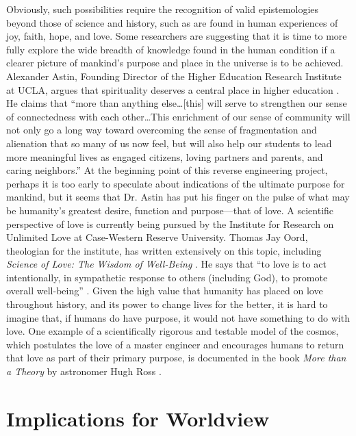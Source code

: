 Obviously, such possibilities require the recognition of valid
epistemologies beyond those of science and history, such as are found
in human experiences of joy, faith, hope, and love. Some researchers
are suggesting that it is time to more fully explore the wide breadth of
knowledge found in the human condition if a clearer picture of
mankind’s purpose and place in the universe is to be achieved.
Alexander Astin, Founding Director of the Higher Education Research
Institute at UCLA, argues that spirituality deserves a central place in
higher education \citep{astin2004}. He claims that ``more than
anything else{\ldots}[this] will serve to strengthen our sense of
connectedness with each other{\ldots}This enrichment of our sense of community
will not only go a long way toward overcoming the sense of
fragmentation and alienation that so many of us now feel, but will also
help our students to lead more meaningful lives as engaged citizens,
loving partners and parents, and caring neighbors.'' At the beginning
point of this reverse engineering project, perhaps it is too early to
speculate about indications of the ultimate purpose for mankind, but it
seems that Dr. Astin has put his finger on the pulse of what may be
humanity’s greatest desire, function and purpose---that of love. A
scientific perspective of love is currently being pursued by the
Institute for Research on Unlimited Love at Case-Western Reserve
University. Thomas Jay Oord, theologian for the institute, has written
extensively on this topic, including \textit{Science of Love: The
Wisdom of Well-Being} \citep{oord2004}. He says that
“to love is to act intentionally, in
sympathetic response to others (including God), to promote overall
well-being” \citep[][p.~75]{oord2004}. Given the high value that humanity has placed on love
throughout history, and its power to change lives for the better, it is
hard to imagine that, if humans do have purpose, it would not have
something to do with love. One example of a scientifically rigorous and
testable model of the cosmos, which postulates the love of a master
engineer and encourages humans to return that love as part of their
primary purpose, is documented in the book
\textit{More than a Theory} 
by astronomer Hugh Ross
\citep{ross2009}.

\section{Implications for Worldview}

